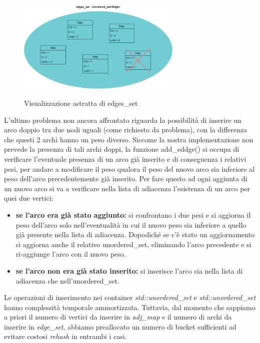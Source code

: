 \begin{figure}[h]
	\caption{Visualizzazione astratta di edges\_set}
	\centering
	\includegraphics[width=0.7\textwidth]{./images/edges_setAbstract.png}
	\label{fig:edges_set}
\end{figure}

L'ultimo problema non ancora affrontato riguarda la possibilità di inserire un arco doppio tra due nodi uguali (come richiesto da problema), con la differenza che questi 2 archi hanno un peso diverso. Siccome la nostra implementazione non prevede la presenza di tali archi doppi, la funzione add\_eddge() si occupa di verificare l'eventuale presenza di un arco già inserito e di conseguenza i relativi pesi, per andare a modificare il peso qualora il peso del nuovo arco sia inferiore al peso dell'arco precedentemente già inserito. Per fare questo ad ogni aggiunta di un nuovo arco si va a verificare nella lista di adiacenza l'esistenza di un arco per quei due vertici:
\begin{itemize}
	\item \textbf{se l'arco era già stato aggiunto:} si confrontano i due pesi e si aggiorna il peso dell'arco solo nell'eventualità in cui il nuovo peso sia inferiore a quello già presente nella lista di adiacenza. Dopodiché se c'è stato un aggiornamento si aggiorna anche il relativo unordered\_set, eliminando l'arco precedente e si ri-aggiunge l'arco con il nuovo peso. 
	\item \textbf{se l'arco non era già stato inserito:} si inserisce l'arco sia nella lista di adiacenza che nell'unordered\_set.
\end{itemize}

\noindent Le operazioni di inserimento nei container \textit{std::unordered\_set} e \textit{std::unordered\_set} hanno complessità temporale \complexityConstant{} ammortizzata. Tuttavia, dal momento che sappiamo a priori il numero di vertici da inserire in \textit{adj\_map} e il numero di archi da inserire in \textit{edge\_set}, abbiamo preallocato un numero di bucket sufficienti ad evitare costosi \textit{rehash} in entrambi i casi.


